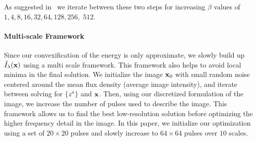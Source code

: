{{{{As suggested in~\cite{zoran2011learning} we iterate between these two steps for increasing $\beta$ values of $1, 4, 8, 16, 32, 64, 128, 256,$ $512$.  


\vspace{-.15in}
\paragraph{Multi-scale Framework}
Since our convexification of the energy is only approximate, we slowly build up $\hat{I}_{\lambda}({\bf x})$ using a multi scale framework. This framework also helps to avoid local minima in the final solution. We initialize the image ${\bf x}_0$ with small random noise centered around the mean flux density (average image intensity), and iterate between solving for $ \{ z^n \}$ and ${\bf x}$. Then, using our discretized formulation of the image, we increase the number of pulses used to describe the image. This framework allows us to find the best low-resolution solution before optimizing the higher frequency detail in the image. In this paper, we initialize our optimization using a set of $20 \times 20$ pulses and slowly increase to $64 \times 64$ pulses over $10$ scales.






}}}}
